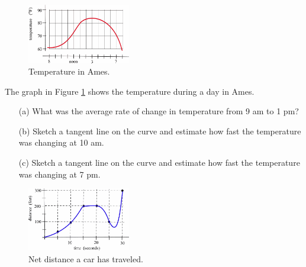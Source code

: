 \begin{enumerate}
\begin{minipage}{\linewidth}
\begin{figure}
    \centering
    \vspace{-12pt}
    \includegraphics[width=0.4\textwidth]{img/chap2/image007.png}
    \caption{Temperature in Ames.}
    \label{fig:2-2-exer5}
\end{figure}

\item	The graph in Figure \ref{fig:2-2-exer5} shows the temperature during a day in Ames.
    \begin{itemize}
    \item[(a)] What was the average rate of change in temperature from  9 am  to  1 pm? 
    \item[(b)] Sketch a tangent line on the curve and estimate how fast the temperature was changing at  10 am.  
    \item[(c)] Sketch a tangent line on the curve and estimate how fast the temperature was changing at 7 pm.
    \end{itemize}
\end{minipage}

\begin{minipage}{\linewidth}
\begin{figure}
    \centering
    \includegraphics[width=0.4\textwidth]{img/chap2/image008.png}
    \caption{Net distance a car has traveled.}
    \label{fig:2-2-exer6}
\end{figure}


\end{minipage}
\end{enumerate}
